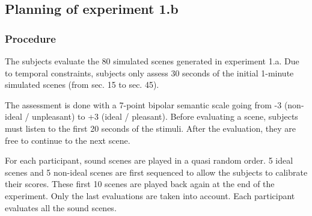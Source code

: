 \documentclass[12pt]{elsarticle}
\begin{document}

\subsection{Planning of experiment 1.b}
\label{sec:xp1b_plan}

\subsubsection*{Procedure}


The subjects evaluate the 80 simulated scenes generated in experiment 1.a. Due to temporal constraints, subjects only assess 30 seconds of the initial 1-minute simulated scenes (from sec. 15 to sec. 45).


The assessment is done with a 7-point bipolar semantic scale going from -3 (non-ideal / unpleasant) to +3 (ideal / pleasant). Before evaluating a scene, subjects must listen to the first 20 seconds of the stimuli. After the evaluation, they are free to continue to the next scene.


For each participant, sound scenes are played in a quasi random order. 5 ideal scenes and 5 non-ideal scenes are first sequenced to allow the subjects to calibrate their scores. These first 10 scenes are played back again at the end of the experiment. Only the last evaluations are taken into account. Each participant evaluates all the sound scenes.
\end{document}
